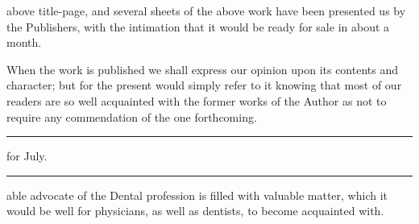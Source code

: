  above title-page, and several sheets of the above work have
been presented us by the Publishers, with the intimation that it would
be ready for sale in about a month.

When the work is published we shall express our opinion upon its
contents and character; but for the present would simply refer to it
knowing that most of our readers are so well acquainted with the former
works of the Author as not to require any commendation of the one
forthcoming.

\fancybreak{* * *}

 for July.
\plainbreak{1}
\normalsize

 able advocate of the Dental profession is filled with valuable
matter, which it would be well for physicians, as well as dentists, to
become acquainted with.\endinput
